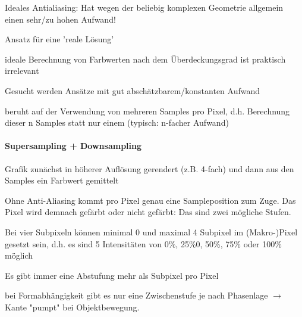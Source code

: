 \documentclass[landscape]{article}
\begin{document}
\begin{multicols}{3}
\begin{itemize*}
\begin{itemize*}
    \end{itemize*}
    \item Ideales Antialiasing: Hat wegen der beliebig komplexen Geometrie allgemein einen sehr/zu hohen Aufwand!
    \item Ansatz für eine 'reale Lösung'
    \begin{itemize*}
      \item ideale Berechnung von Farbwerten nach dem Überdeckungsgrad ist praktisch irrelevant
      \item Gesucht werden Ansätze mit gut abschätzbarem/konstanten Aufwand
      \item beruht auf der Verwendung von mehreren Samples pro Pixel, d.h. Berechnung dieser n Samples statt nur einem (typisch: n-facher Aufwand)
    \end{itemize*}
  \end{itemize*}
  
  \paragraph{Supersampling + Downsampling}
  \begin{itemize*}
    \item Grafik zunächst in höherer Auflösung gerendert (z.B. 4-fach) und dann aus den Samples ein Farbwert gemittelt
    \item Ohne Anti-Aliasing kommt pro Pixel genau eine Sampleposition zum Zuge. Das Pixel wird demnach gefärbt oder nicht gefärbt: Das sind zwei mögliche Stufen.
    \item Bei vier Subpixeln können minimal 0 und maximal 4 Subpixel im (Makro-)Pixel gesetzt sein, d.h. es sind 5 Intensitäten von 0\%, 25\%0, 50\%, 75\% oder 100\% möglich
    \item Es gibt immer eine Abstufung mehr als Subpixel pro Pixel
    \item bei Formabhängigkeit gibt es nur eine Zwischenstufe je nach Phasenlage $\rightarrow$ Kante "pumpt" bei Objektbewegung.
  \end{itemize*}
  

\end{multicols}
\end{document}
